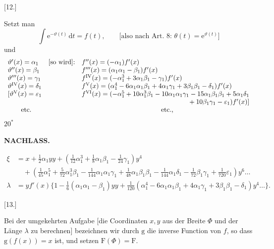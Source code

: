 \begin{center}[12.]\end{center}
Setzt man
\[
\int\mathrm e^{-\vartheta(t)}\,\mathrm dt=f(t),\qquad
\text{[also nach Art.\ 8: }\theta(t)=\mathrm e^{\vartheta(t)}\text{]}
\]
\noindent und
\[
\begin{array}{l@{\quad}l@{\quad}l}
\vartheta'(x)=\alpha_1&\text{[so wird]:}&f''(x)=(-\alpha_1)f'(x)\\
\vartheta''(x)=\beta_1&&f'''(x)=(\alpha_1\alpha_1-\beta_1)f'(x)\\
\vartheta'''(x)=\gamma_1&&
 f^{\mathrm{IV}}(x)=(-\alpha_1^3+3\alpha_1\beta_1-\gamma_1)f'(x)\\
\vartheta^{\mathrm{IV}}(x)=\delta_1&&
 f^{\mathrm V}(x)=(\alpha_1^4-6\alpha_1\alpha_1\beta_1+4\alpha_1\gamma_1
 +3\beta_1\beta_1-\delta_1)f'(x)\\
\mathopen{[}\vartheta^{\mathrm V}(x)=\varepsilon_1&&
 f^{\mathrm{VI}}(x)=(-\alpha_1^5+10\alpha_1^3\beta_1-10\alpha_1\alpha_1\gamma_1
 -15\alpha_1\beta_1\beta_1+5\alpha_1\delta_1\\
&&\multicolumn{1}{r}{{}+10\beta_1\gamma_1-\varepsilon_1)f'(x)]}\\
\qquad\text{etc.}&&\multicolumn{1}{c}{\text{etc.,}}
\end{array}
\]
\noindent\hfill \(20^{*}\)\hspace*{.17\linewidth}\par
\par\clearpage
\noindent{}\hfill{\small\textbf{NACHLASS.}}\hfill\null\par\medskip

\[
\begin{aligned}
\xi&=x+\tfrac12\alpha_1yy+
  (\tfrac1{12}\alpha_1^3+\tfrac18\alpha_1\beta_1-\tfrac1{24}\gamma_1)y^4\\
 &\quad+(\tfrac1{45}\alpha_1^5+\tfrac5{72}\alpha_1^3\beta_1
 -\tfrac1{144}\alpha_1\alpha_1\gamma_1+\tfrac1{48}\alpha_1\beta_1\beta_1
 -\tfrac1{144}\alpha_1\delta_1-\tfrac1{72}\beta_1\gamma_1
 +\tfrac1{720}\varepsilon_1)y^6\ldots\\
\lambda&=yf'(x)\{1-\tfrac16(\alpha_1\alpha_1-\beta_1)yy+
  \tfrac1{120}(\alpha_1^4-6\alpha_1\alpha_1\beta_1+4\alpha_1\gamma_1
  +3\beta_1\beta_1-\delta_1)y^4\ldots\}.
\end{aligned}
\]

\begin{center}
[13.]\par{}
\end{center}
Bei der umgekehrten Aufgabe [die Coordinaten \(x,y\) aus der Breite \(\Phi\) und
der Länge \(\lambda\) zu berechnen] bezeichnen wir durch \(\mathrm g\) die inverse Function
von \(f\), so dass \(\mathrm g(f(x))=x\) ist, und setzen \(\mathrm F(\Phi)=\mathrm F\).

